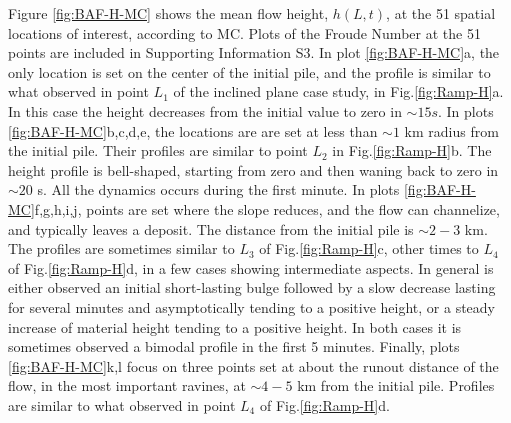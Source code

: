 \documentclass{article}
\begin{document}
Figure \ref{fig:BAF-H-MC} shows the mean flow height, $h(L,t)$, at the 51 spatial locations of interest, according to MC. Plots of the Froude Number at the 51 points are included in Supporting Information S3. In plot \ref{fig:BAF-H-MC}a, the only location is set on the center of the initial pile, and the profile is similar to what observed in point $L_1$ of the inclined plane case study, in Fig.\ref{fig:Ramp-H}a. In this case the height decreases from the initial value to zero in $\sim 15 s$. In plots \ref{fig:BAF-H-MC}b,c,d,e, the locations are are set at less than $\sim 1$ km radius from the initial pile. Their profiles are similar to point $L_2$ in Fig.\ref{fig:Ramp-H}b. The height profile is bell-shaped, starting from zero and then waning back to zero in $\sim 20$ s. All the dynamics occurs during the first minute. In plots \ref{fig:BAF-H-MC}f,g,h,i,j, points are set where the slope reduces, and the flow can channelize, and typically leaves a deposit. The distance from the initial pile is $\sim 2-3$ km. The profiles are sometimes similar to $L_3$ of Fig.\ref{fig:Ramp-H}c, other times to $L_4$ of Fig.\ref{fig:Ramp-H}d, in a few cases showing intermediate aspects. In general is either observed an initial short-lasting bulge followed by a slow decrease lasting for several minutes and asymptotically tending to a positive height, or a steady increase of material height tending to a positive height. In both cases it is sometimes observed a bimodal profile in the first 5 minutes. Finally, plots \ref{fig:BAF-H-MC}k,l focus on three points set at about the runout distance of the flow, in the most important ravines, at $\sim 4-5$ km from the initial pile. Profiles are similar to what observed in point $L_4$ of Fig.\ref{fig:Ramp-H}d.
\end{document}
